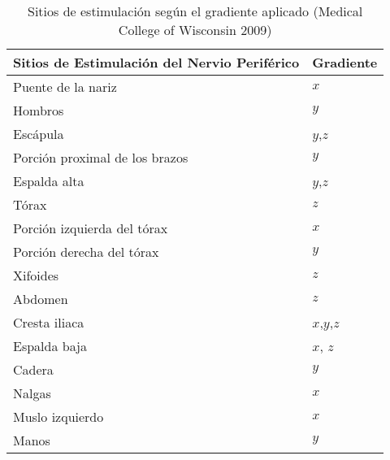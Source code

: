\begin{table}[hbtp]
\centering
\caption{Sitios de estimulación según el gradiente aplicado (Medical College of Wisconsin 2009)}
\label{tab_seguridad}
\begin{tabular}{@{}ll@{}}
\toprule
\textbf{Sitios de Estimulación del Nervio Periférico} & \textbf{Gradiente}   \\ \midrule
Puente de la nariz                           & $x$         \\
Hombros                                      & $y$         \\
Escápula                                     & $y$,$z$     \\
Porción proximal de los brazos               & $y$         \\
Espalda alta                                 & $y$,$z$     \\
Tórax                                        & $z$         \\
Porción izquierda del tórax                  & $x$         \\
Porción derecha del tórax                    & $y$         \\
Xifoides                                     & $z$         \\
Abdomen                                      & $z$         \\
Cresta iliaca                                & $x$,$y$,$z$ \\
Espalda baja                                 & $x$, $z$    \\
Cadera                                       & $y$         \\
Nalgas                                       & $x$         \\
Muslo izquierdo                              & $x$         \\
Manos                                        & $y$         \\ \bottomrule
\end{tabular}
\end{table}


